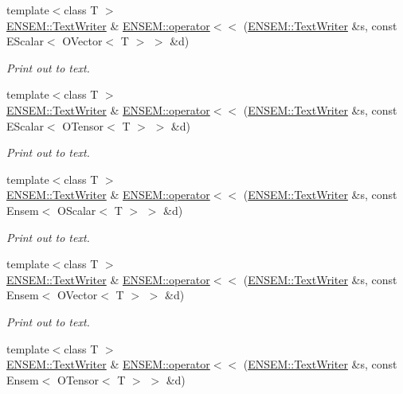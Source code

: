 \begin{DoxyCompactItemize}
{\footnotesize template$<$class T $>$ }\\\mbox{\hyperlink{classENSEM_1_1TextWriter}{E\+N\+S\+E\+M\+::\+Text\+Writer}} \& \mbox{\hyperlink{namespaceENSEM_a7805eb4e273ee2d88e608b67e6a92d7c}{E\+N\+S\+E\+M\+::operator$<$$<$}} (\mbox{\hyperlink{classENSEM_1_1TextWriter}{E\+N\+S\+E\+M\+::\+Text\+Writer}} \&s, const E\+Scalar$<$ O\+Vector$<$ T $>$ $>$ \&d)
\begin{DoxyCompactList}\small\item\em Print out to text. \end{DoxyCompactList}\item 
{\footnotesize template$<$class T $>$ }\\\mbox{\hyperlink{classENSEM_1_1TextWriter}{E\+N\+S\+E\+M\+::\+Text\+Writer}} \& \mbox{\hyperlink{namespaceENSEM_a7e41e43f669c8c025f5ea84f65990bc2}{E\+N\+S\+E\+M\+::operator$<$$<$}} (\mbox{\hyperlink{classENSEM_1_1TextWriter}{E\+N\+S\+E\+M\+::\+Text\+Writer}} \&s, const E\+Scalar$<$ O\+Tensor$<$ T $>$ $>$ \&d)
\begin{DoxyCompactList}\small\item\em Print out to text. \end{DoxyCompactList}\item 
{\footnotesize template$<$class T $>$ }\\\mbox{\hyperlink{classENSEM_1_1TextWriter}{E\+N\+S\+E\+M\+::\+Text\+Writer}} \& \mbox{\hyperlink{namespaceENSEM_af434a2aefc7c29bdad68fc50cdeda436}{E\+N\+S\+E\+M\+::operator$<$$<$}} (\mbox{\hyperlink{classENSEM_1_1TextWriter}{E\+N\+S\+E\+M\+::\+Text\+Writer}} \&s, const Ensem$<$ O\+Scalar$<$ T $>$ $>$ \&d)
\begin{DoxyCompactList}\small\item\em Print out to text. \end{DoxyCompactList}\item 
{\footnotesize template$<$class T $>$ }\\\mbox{\hyperlink{classENSEM_1_1TextWriter}{E\+N\+S\+E\+M\+::\+Text\+Writer}} \& \mbox{\hyperlink{namespaceENSEM_a3c090895fd0fa6d7da4aad84a847056f}{E\+N\+S\+E\+M\+::operator$<$$<$}} (\mbox{\hyperlink{classENSEM_1_1TextWriter}{E\+N\+S\+E\+M\+::\+Text\+Writer}} \&s, const Ensem$<$ O\+Vector$<$ T $>$ $>$ \&d)
\begin{DoxyCompactList}\small\item\em Print out to text. \end{DoxyCompactList}\item 
{\footnotesize template$<$class T $>$ }\\\mbox{\hyperlink{classENSEM_1_1TextWriter}{E\+N\+S\+E\+M\+::\+Text\+Writer}} \& \mbox{\hyperlink{namespaceENSEM_ab439878443da80b5f8032475e52cfc90}{E\+N\+S\+E\+M\+::operator$<$$<$}} (\mbox{\hyperlink{classENSEM_1_1TextWriter}{E\+N\+S\+E\+M\+::\+Text\+Writer}} \&s, const Ensem$<$ O\+Tensor$<$ T $>$ $>$ \&d)

\end{DoxyCompactItemize}
